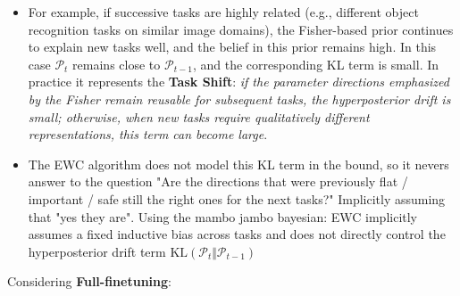 \documentclass{article}
\theoremstyle{plain}
\theoremstyle{definition}
\theoremstyle{remark}
\begin{document}
\begin{itemize}
\begin{itemize}
        where $S_1, \ldots, S_t$ are the past tasks.
        \item  For example, if successive tasks are highly related (e.g., different object recognition tasks on similar image domains), the Fisher-based prior continues to explain new tasks well, and the belief in this prior remains high. In this case  $\mathcal{P}_t$ remains close to $\mathcal{P}_{t-1}$, and the corresponding KL term is small. In practice it represents the \textbf{Task Shift}: \textit{if the parameter directions emphasized by the Fisher remain reusable for subsequent tasks, the hyperposterior drift is small; otherwise, when new tasks require qualitatively different representations, this term can become large}.
        \item The EWC algorithm does not model this KL term in the bound, so it nevers answer to the question "Are the directions that were previously flat / important / safe still the right ones for the next tasks?" Implicitly assuming that "yes they are". Using the mambo jambo bayesian: EWC implicitly assumes a fixed inductive bias across tasks and does not directly control the hyperposterior drift term $\mathrm{KL}(\mathcal P_t \Vert \mathcal P_{t-1})$ 
    \end{itemize}
\end{itemize}
Considering \textbf{Full-finetuning}:
\end{document}
